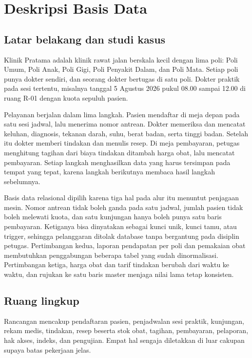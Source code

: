 \documentclass[12pt,a4paper]{article}
\begin{document}
\tableofcontents
\newpage

\section{Deskripsi Basis Data}

\subsection{Latar belakang dan studi kasus}

Klinik Pratama adalah klinik rawat jalan berskala kecil dengan lima poli: Poli
Umum, Poli Anak, Poli Gigi, Poli Penyakit Dalam, dan Poli Mata. Setiap poli
punya dokter sendiri, dan seorang dokter bertugas di satu poli. Dokter praktik
pada sesi tertentu, misalnya tanggal 5 Agustus 2026 pukul 08.00 sampai 12.00 di
ruang R-01 dengan kuota sepuluh pasien.

Pelayanan berjalan dalam lima langkah. Pasien mendaftar di meja depan pada satu
sesi jadwal, lalu menerima nomor antrean. Dokter memeriksa dan mencatat keluhan,
diagnosis, tekanan darah, suhu, berat badan, serta tinggi badan. Setelah itu
dokter memberi tindakan dan menulis resep. Di meja pembayaran, petugas
menghitung tagihan dari biaya tindakan ditambah harga obat, lalu mencatat
pembayaran. Setiap langkah menghasilkan data yang harus tersimpan pada tempat
yang tepat, karena langkah berikutnya membaca hasil langkah sebelumnya.

Basis data relasional dipilih karena tiga hal pada alur itu menuntut penjagaan
mesin. Nomor antrean tidak boleh ganda pada satu jadwal, jumlah pasien tidak
boleh melewati kuota, dan satu kunjungan hanya boleh punya satu baris
pembayaran. Ketiganya bisa dinyatakan sebagai kunci unik, kunci tamu, atau
trigger, sehingga pelanggaran ditolak database tanpa bergantung pada disiplin
petugas. Pertimbangan kedua, laporan pendapatan per poli dan pemakaian obat
membutuhkan penggabungan beberapa tabel yang sudah dinormalisasi. Pertimbangan
ketiga, harga obat dan tarif tindakan berubah dari waktu ke waktu, dan rujukan
ke satu baris master menjaga nilai lama tetap konsisten.

\subsection{Ruang lingkup}

Rancangan mencakup pendaftaran pasien, penjadwalan sesi praktik, kunjungan,
rekam medis, tindakan, resep beserta stok obat, tagihan, pembayaran, pelaporan,
hak akses, indeks, dan pengujian. Empat hal sengaja diletakkan di luar cakupan
supaya batas pekerjaan jelas.
\end{document}

